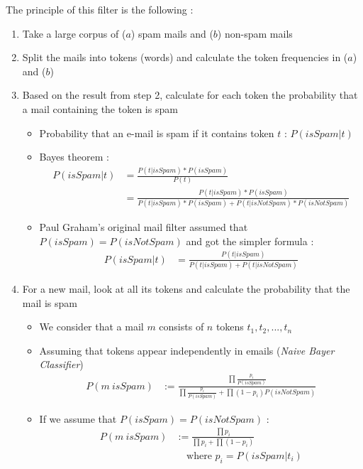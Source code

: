 The principle of this filter is the following :
\begin{enumerate}
    \item Take a large corpus of ($a$) spam mails and ($b$) non-spam mails
    \item Split the mails into tokens (words) and calculate the token frequencies in ($a$) and ($b$)
    \item Based on the result from step 2, calculate for each token the probability that a mail containing the token is spam
    \begin{itemize}
        \item Probability that an e-mail is spam if it contains token $t$ : $P(isSpam | t)$
        \item Bayes theorem :
        \begin{align*}
        P(isSpam | t) &= \frac{P(t | isSpam) * P(isSpam)}{P(t)}\\
                      &= \frac{P(t | isSpam) * P(isSpam)}{P(t | isSpam) * P(isSpam) + P(t | isNotSpam) * P(isNotSpam)}
        \end{align*}
        \item Paul Graham's original mail filter assumed that $P(isSpam) = P(isNotSpam)$ and got the simpler formula :
        \begin{align*}
        P(isSpam | t) &= \frac{P(t | isSpam)}{P(t | isSpam) + P(t | isNotSpam)}
        \end{align*}
    \end{itemize}
    \item For a new mail, look at all its tokens and calculate the probability that the mail is spam
    \begin{itemize}
        \item We consider that a mail $m$ consists of $n$ tokens $t_1, t_2, ..., t_n$
        \item Assuming that tokens appear independently in emails (\textit{Naive Bayer Classifier})
        \begin{align*}
        P(m\ isSpam) &:= \frac{\prod \frac{p_i}{P(isSpam)}}{\prod \frac{p_i}{P(isSpam)} + \prod(1-p_i)P(isNotSpam)}
        \end{align*}
        \item If we assume that $P(isSpam) = P(isNotSpam)$ :
        \begin{align*}
        P(m\ isSpam) &:= \frac{\prod p_i}{\prod p_i + \prod(1-p_i)}\\
                     &\ \ \ \ \ \text{where }p_i = P(isSpam | t_i)
        \end{align*}
    \end{itemize}
\end{enumerate}

